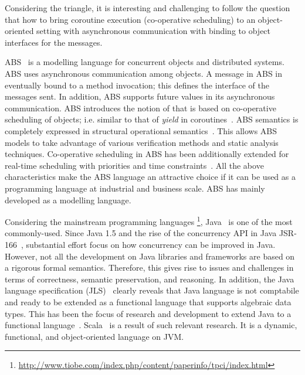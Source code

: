Considering the triangle, it is interesting and challenging to follow the question that how to bring coroutine execution (co-operative scheduling) to an object-oriented setting with asynchronous communication with binding to object interfaces for the messages.  

ABS~\cite{johnsen2012abs,hahnlehjlssw11} is a modelling language for concurrent objects and distributed systems.
ABS uses asynchronous communication among objects.
A message in ABS in eventually bound to a method invocation;
this defines the interface of the messages sent.
In addition, ABS supports future values in its asynchronous communication.
ABS introduces the notion of  that is based on co-operative scheduling of objects; i.e. similar to that of \emph{yield} in coroutines~\cite{creol:broch:owe}.
ABS semantics is completely expressed in structural operational semantics~\cite{plotkin:sos}.
This allows ABS models to take advantage of various verification methods and static analysis techniques.
% 
Co-operative scheduling in ABS has been additionally extended for real-time scheduling with priorities and time constraints~\cite{bjork2013:rtabs,johnsen2012modeling}.
All the above characteristics make the ABS language an attractive choice if it
can be used as a programming language at industrial and business scale.
ABS has mainly developed as a modelling language.

Considering the mainstream programming languages
\footnote{\url{http://www.tiobe.com/index.php/content/paperinfo/tpci/index.html}}, Java~\cite{gosling2000java} is one of the most commonly-used.
Since Java 1.5 and the rise of the concurrency API in Java JSR-166~\cite{jsr166}, substantial effort focus on how concurrency can be improved in Java.
However, not all the development on Java libraries and frameworks are based on a rigorous formal semantics. 
Therefore, this gives rise to issues and challenges in terms of correctness, semantic preservation, and reasoning.
In addition, the Java language specification (JLS)~\cite{gosling2000java} clearly reveals that Java language is not comptabile and ready to be extended as a functional language that supports algebraic data types.
This has been the focus of research and development to extend Java to a functional language~\cite{odersky1997pizza,henkel2003discovering,nystrom2003polyglot,bracha1998making}.
Scala~\cite{odersky2004scala} is a result of such relevant research. It is a dynamic, functional, and object-oriented language on JVM.

